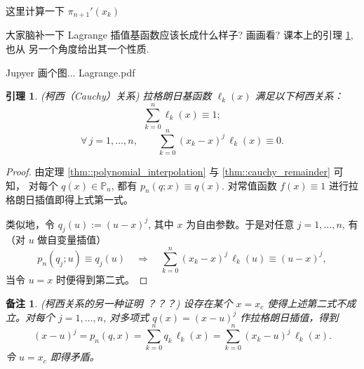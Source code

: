 \documentclass[a4paper]{ctexart}
\newtheorem{remark}{备注}
\newtheorem{lemma}[theorem]{引理}
\numberwithin{theorem}{section}
\numberwithin{equation}{section}
\numberwithin{figure}{section}
\numberwithin{remark}{section}
\begin{document}
这里计算一下 $\pi_{n + 1}'(x_k)$

大家脑补一下 Lagrange 插值基函数应该长成什么样子? 画画看? 课本上的引理 \ref{lem::cauchy}, 也从
另一个角度给出其一个性质. 

Jupyer 画个图... Lagrange.pdf

\begin{lemma}(柯西（Cauchy）关系)
    \label{lem::cauchy}
拉格朗日基函数 $\ell_k(x)$ 满足以下柯西关系：
\begin{equation}
    \label{eq::cauchy}
\sum_{k=0}^{n}\ell_k(x)\equiv 1;
\end{equation}
\begin{equation}
    \label{eq::cauchy_higher}
\forall\, j=1,\ldots,n,\qquad \sum_{k=0}^{n}(x_k-x)^{j}\,\ell_k(x)\equiv 0.
\end{equation}
\end{lemma}
\begin{proof}
由定理 \ref{thm::polynomial_interpolation} 与 \ref{thm::cauchy_remainder} 可知，
对每个 $q(x)\in\mathbb{P}_n$, 都有 $p_n(q;x)\equiv q(x)$. 
对常值函数 $f(x)\equiv 1$ 进行拉格朗日插值即得上式第一式。

类似地，令 $q_j(u):=(u-x)^j$, 其中 $x$ 为自由参数。于是对任意 $j=1,\ldots,n$, 有 （对 $u$ 做自变量插值）
\begin{equation*}
p_n(q_j;u)\equiv q_j(u)\quad \Rightarrow \quad \sum_{k=0}^{n}(x_k-x)^j\,\ell_k(u)\equiv (u-x)^j,
\end{equation*}
当令 $u=x$ 时便得到第二式。
\end{proof}




\begin{remark}
(柯西关系的另一种证明 ？？？)
设存在某个 $x=x_c$ 使得上述第二式不成立。对每个 $j=1,\ldots,n$, 
对多项式 $q(x)=(x-u)^j$ 作拉格朗日插值，得到
\begin{equation*}
(x-u)^j=p_n(q,x)=\sum_{k=0}^{n}q_k\,\ell_k(x)=\sum_{k=0}^{n}(x_k-u)^j\,\ell_k(x).
\end{equation*}
令 $u=x_c$ 即得矛盾。    
\end{remark}
\end{document}

